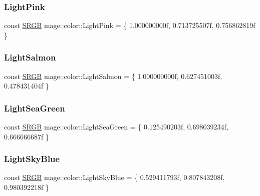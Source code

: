 \subsubsection{\texorpdfstring{Light\+Pink}{LightPink}}
{\footnotesize\ttfamily const \hyperlink{structmage_1_1_s_r_g_b}{S\+R\+GB} mage\+::color\+::\+Light\+Pink = \{ 1.\+000000000f, 0.\+713725507f, 0.\+756862819f \}}

\hypertarget{namespacemage_1_1color_a83c81b20c0c848aa51e50c3c574468cd}{}\label{namespacemage_1_1color_a83c81b20c0c848aa51e50c3c574468cd} 
\subsubsection{\texorpdfstring{Light\+Salmon}{LightSalmon}}
{\footnotesize\ttfamily const \hyperlink{structmage_1_1_s_r_g_b}{S\+R\+GB} mage\+::color\+::\+Light\+Salmon = \{ 1.\+000000000f, 0.\+627451003f, 0.\+478431404f \}}

\hypertarget{namespacemage_1_1color_a278937da295e5392f41da5c397c11974}{}\label{namespacemage_1_1color_a278937da295e5392f41da5c397c11974} 
\subsubsection{\texorpdfstring{Light\+Sea\+Green}{LightSeaGreen}}
{\footnotesize\ttfamily const \hyperlink{structmage_1_1_s_r_g_b}{S\+R\+GB} mage\+::color\+::\+Light\+Sea\+Green = \{ 0.\+125490203f, 0.\+698039234f, 0.\+666666687f \}}

\hypertarget{namespacemage_1_1color_a1eadc5042ec89f5476bc00a34d35f08e}{}\label{namespacemage_1_1color_a1eadc5042ec89f5476bc00a34d35f08e} 
\subsubsection{\texorpdfstring{Light\+Sky\+Blue}{LightSkyBlue}}
{\footnotesize\ttfamily const \hyperlink{structmage_1_1_s_r_g_b}{S\+R\+GB} mage\+::color\+::\+Light\+Sky\+Blue = \{ 0.\+529411793f, 0.\+807843208f, 0.\+980392218f \}}

\hypertarget{namespacemage_1_1color_a6795688f07f23e699b7aff0ff67eff83}{}\label{namespacemage_1_1color_a6795688f07f23e699b7aff0ff67eff83} 
